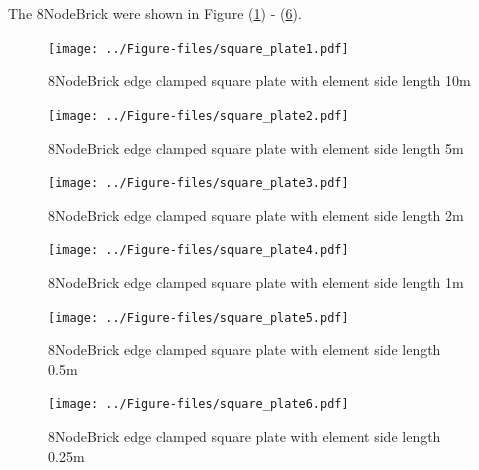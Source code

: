 \documentclass[fleqn,11pt]{article}
\begin{document}
The 8NodeBrick were shown in Figure (\ref{fig 8NodeBrick edges clamped square plate with element side length 10m }) - (\ref{fig 8NodeBrick edges clamped square plate with element side length 0.25m }). 


\begin{figure}[H]
  \centering
  \texttt{[image: ../Figure-files/square\_plate1.pdf]}
  \caption{8NodeBrick edge clamped square plate with element side length 10m }
  \label{fig 8NodeBrick edges clamped square plate with element side length 10m }
\end{figure}

\newpage

\begin{figure}[H]
  \centering
  \texttt{[image: ../Figure-files/square\_plate2.pdf]}
  \caption{8NodeBrick edge clamped square plate with element side length 5m }
  \label{fig 8NodeBrick edges clamped square plate with element side length 5m }
\end{figure}


\begin{figure}[H]
  \centering
  \texttt{[image: ../Figure-files/square\_plate3.pdf]}
  \caption{8NodeBrick edge clamped square plate with element side length 2m }
  \label{fig 8NodeBrick edges clamped square plate with element side length 2m }
\end{figure}

\newpage

\begin{figure}[H]
  \centering
  \texttt{[image: ../Figure-files/square\_plate4.pdf]}
  \caption{8NodeBrick edge clamped square plate with element side length 1m }
  \label{fig 8NodeBrick edges clamped square plate with element side length 1m }
\end{figure}


\begin{figure}[H]
  \centering
  \texttt{[image: ../Figure-files/square\_plate5.pdf]}
  \caption{8NodeBrick edge clamped square plate with element side length 0.5m }
  \label{fig 8NodeBrick edges clamped square plate with element side length 0.5m }
\end{figure}

\newpage

\begin{figure}[H]
  \centering
  \texttt{[image: ../Figure-files/square\_plate6.pdf]}
  \caption{8NodeBrick edge clamped square plate with element side length 0.25m }
  \label{fig 8NodeBrick edges clamped square plate with element side length 0.25m }
\end{figure}
\end{document}
